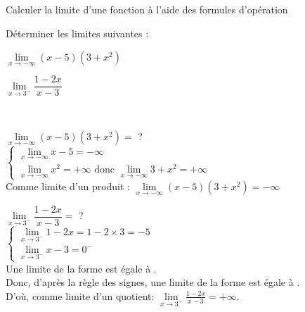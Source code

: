 \begin{bmethodet}{Calculer la limite d'une fonction à l'aide des formules d'opération}
	
	Déterminer les limites suivantes :
	\begin{enumMet}
		\item $\lim \limits_{x \rightarrow-\infty}(x-5)\left(3+x^{2}\right)$
		\item $\lim \limits_{x \rightarrow 3^{-}} \dfrac{1-2 x}{x-3}$
	\end{enumMet}
	\ \\
	\begin{enumMet}
		\item $\lim \limits_{x \rightarrow-\infty}(x-5)\left(3+x^{2}\right)=$ ?\\
		$\left\{\begin{array}{l}\lim \limits_{x \rightarrow-\infty} x-5=-\infty \\ \lim \limits_{x \rightarrow-\infty} x^{2}=+\infty \text { donc } \lim \limits_{x \rightarrow-\infty} 3+x^{2}=+\infty\end{array}\right.$\\
		Comme limite d'un produit : $\lim \limits_{x \rightarrow-\infty}(x-5)\left(3+x^{2}\right)=-\infty$
		\item $\lim \limits_{x \rightarrow 3^{-}} \dfrac{1-2 x}{x-3}=$ ?\\
		$\left\{\begin{array}{l}\lim \limits_{x \rightarrow 3^{-}} 1-2 x=1-2 \times 3=-5 \\ \lim \limits_{x \rightarrow 3^{-}} x-3=0^{-}\end{array}\right.$\\
		Une limite de la forme   est égale à \guillemets{$\infty$}.\\
		Donc, d'après la règle des signes, une limite de la forme  est égale à \guillemets{$+\infty$}.\\
		D'où, comme limite d'un quotient: $\lim \limits_{x \rightarrow 3^{-}} \frac{1-2 x}{x-3}=+\infty$.
	\end{enumMet}
\end{bmethodet}

